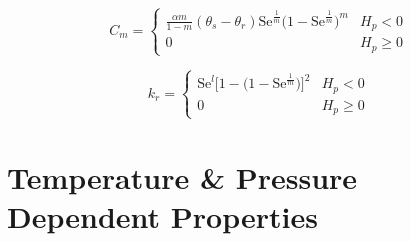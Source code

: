 \documentclass[../main.tex]{subfiles}
\begin{document}
\begin{equation}
  C_m = \begin{cases}
    \frac{\alpha m}{1-m}(\theta_s - \theta_r)\mathrm{Se}^{\frac{1}{m}}\big( 1 - \mathrm{Se}^{\frac{1}{m}} \big)^m & H_p < 0 \\
    0 & H_p \geq 0
  \end{cases}
\end{equation}

\begin{equation}
  k_r = \begin{cases}
    \mathrm{Se}^l \big[ 1 - \big( 1 - \mathrm{Se}^\frac{1}{m} \big) \big]^2 & H_p < 0 \\
    0 & H_p \geq 0
  \end{cases}
\end{equation}

\section{Temperature \& Pressure Dependent Properties}
\end{document}

